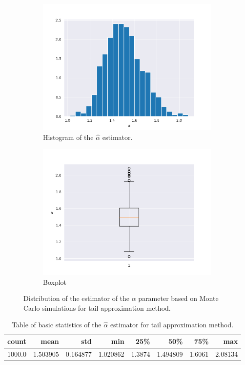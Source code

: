 \documentclass{article}
\begin{document}
		\begin{figure}[H]
			\begin{subfigure}{.5\textwidth}
				\centering
				\includegraphics[width=1\linewidth]{images/cdf_alpha_hist.png}
				\caption{Histogram of the $\hat\alpha$ estimator.				}
			\end{subfigure}
			\begin{subfigure}[r]{.5\textwidth}
				\centering
				\includegraphics[width=1\linewidth]{images/cdf_alpha_boxplot.png}
				\caption{Boxplot}
			\end{subfigure}
			\caption{Distribution of the estimator of the $\alpha$ parameter based on Monte Carlo simulations for tail approximation method.}\label{alpha1}
		\end{figure}
		\begin{table}[H]
			\centering
			\begin{tabular}{|r|r|r|r|r|r|r|r|}
				\hline
				count &      mean &       std &       min &     25\% &       50\% &     75\% &      max \\\hline
				1000.0 &  1.503905 &  0.164877 &  1.020862 &  1.3874 &  1.494809 &  1.6061 &  2.08134 \\\hline
			\end{tabular}
			\caption{Table of basic statistics of the $\hat\alpha$ estimator for tail approximation method.}
		\end{table}
\end{document}
